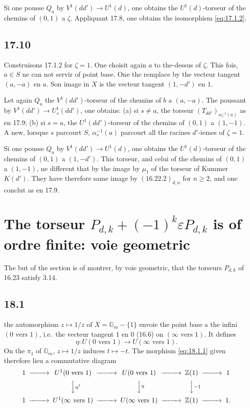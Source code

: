 \documentclass[12pt,a4paper]{article}
\theoremstyle{plain}
\theoremstyle{definition}
\theoremstyle{remark}
\newcommand{\Gm}{\mathbb{G}_m}
\newcommand{\ZZ}{\mathbb{Z}}
\begin{document}
Si one pousse $Q_a$ by $V^1(dd') \to U^1(d)$, one obtains the
$U^1(d)$-torseur of the chemins of $(0,1)$ a $\zeta$. Appliquant 17.8, one obtains the isomorphism \eqref{eq:17.1.2}.

\subsection{17.10}

Construisons 17.1.2 for $\zeta = 1$. One choisit again $a$
to the-dessus of $\zeta$. This fois, $a \in S$ ne can not servir of point
base. One the remplace by the vecteur tangent $(a,-a)$ en $a$. Son
image in $X$ is the vecteur tangent $(1,-d')$ en $1$.

Let again $Q_a$ the $V^1(dd')$-torseur of the chemins of $b$ a
$(a,-a)$. The poussant by $V^1(dd') \to U_s^1(dd')$, one obtains: (a)
si $s \neq a$, the torseur $(T_{dd'})_{\alpha_s^{-1}(a)}$ as en 17.9;
(b) si $s = a$, the $U^1(dd')$-torseur of the chemins of $(0,1)$ a
$(1,-1)$. A new, lorsque $s$ parcourt $S$, $\alpha_s^{-1}(a)$
parcourt all the racines $d'$-iemes of $\zeta = 1$.

Si one pousse $Q_a$ by $V^1(dd') \to U^1(d)$, one obtains the
$U^1(d)$-torseur of the chemins of $(0,1)$ a $(1,-d')$. This torseur, and
celui of the chemins of $(0,1)$ a $(1,-1)$, ne different that by
the image by $\mu_1$ of the torseur of Kummer $K(d')$. They have therefore same
image by $(16.22.2)_{d,n}$ for $n \geq 2$, and one conclut as en
17.9.


\section{The torseur $P_{d,k} + (-1)^k \varepsilon P_{d,k}$ is of ordre finite:
voie geometric}\label{sec:18}

The but of the section is of montrer, by voie geometric, that the
torseurs $P_{d,k}$ of 16.23 satisfy 3.14.

\subsection{18.1}

the automorphism $z \mapsto 1/z$ of $X = \Gm - \{1\}$ envoie the point
base a the infini $(0 \text{ vers } 1)$, i.e.\ the vecteur tangent $1$ en
$0$ (16.6) on $(\infty \text{ vers } 1)$. It defines
\begin{equation}\label{eq:18.1.1}
\eta : U(0 \text{ vers } 1) \to U(\infty \text{ vers } 1).
\end{equation}
On the $\pi_1$ of $\Gm$, $z \mapsto 1/z$ induces $t \mapsto -t$. The
morphism \eqref{eq:18.1.1} given therefore lieu a commutative diagram
\begin{equation}\label{eq:18.1.2}
\begin{CD}
1 @>>> U^1(0 \text{ vers } 1) @>>> U(0 \text{ vers } 1) @>>> \ZZ(1) @>>> 1 \\
@. @VV{\eta^1}V @VV{\eta}V @VV{-1}V \\
1 @>>> U^1(\infty \text{ vers } 1) @>>> U(\infty \text{ vers } 1) @>>> \ZZ(1) @>>> 1.
\end{CD}
\end{equation}
\end{document}
